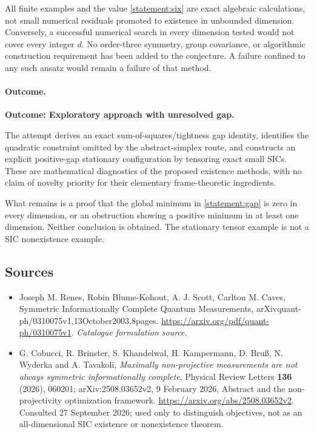 \documentclass[11pt,a4paper]{article}
\numberwithin{equation}{section}
\begin{document}
All finite examples and the value \eqref{statement:six} are exact algebraic
calculations, not small numerical residuals promoted to existence in
unbounded dimension. Conversely, a successful numerical search in every
dimension tested would not cover every integer $d$. No order-three
symmetry, group covariance, or algorithmic construction requirement has
been added to the conjecture. A failure confined to any such ansatz
would remain a failure of that method.

\paragraph{Outcome.}
\textbf{Outcome: Exploratory approach with unresolved gap.}

The attempt derives an exact sum-of-squares/tightness gap identity,
identifies the quadratic constraint omitted by the abstract-simplex
route, and constructs an explicit positive-gap stationary configuration
by tensoring exact small SICs. These are mathematical diagnostics of the
proposed existence methods, with no claim of novelty priority for their
elementary frame-theoretic ingredients.

What remains is a proof that the global minimum in
\eqref{statement:gap} is zero in every dimension, or an obstruction showing a
positive minimum in at least one dimension. Neither conclusion is
obtained. The stationary tensor example is not a SIC nonexistence
example.
\subsection{Sources}
\begin{itemize}\raggedright
\item[\textnormal{[S1]}]\hypertarget{source:statement:1}{} Joseph M. Renes, Robin Blume-Kohout, A. J. Scott, Carlton M. Caves, Symmetric Informationally Complete Quantum Measurements, arXivquant-ph/0310075v1,13October2003,8pages.
\url{https://arxiv.org/pdf/quant-ph/0310075v1}.
{\small\textit{Catalogue formulation source.}}
\item[\textnormal{[E1]}]\hypertarget{extra:statement:1}{}
G. Cobucci, R. Brinster, S. Khandelwal, H. Kampermann, D. Bru\ss,
N. Wyderka and A. Tavakoli, \emph{Maximally non-projective measurements
are not always symmetric informationally complete}, Physical Review
Letters \textbf{136} (2026), 060201; arXiv:2508.03652v2,
9 February 2026, Abstract and the non-projectivity optimization framework.
\url{https://arxiv.org/abs/2508.03652v2}.
Consulted 27 September 2026; used only to distinguish objectives, not as
an all-dimensional SIC existence or nonexistence theorem.
\end{itemize}
\end{document}
